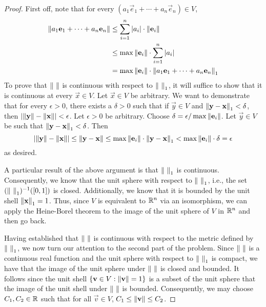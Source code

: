 \documentclass[../psets.tex]{subfiles}
\begin{document}
\begin{enumerate}
\begin{enumerate}
\begin{proof}
            First off, note that for every $(a_1\vec{e}_1+\cdots+a_n\vec{e}_n)\in V$,
            \begin{align*}
                \norm{a_1\mathbf{e}_1+\cdots+a_n\mathbf{e}_n} &\leq \sum_{i=1}^n|a_i|\cdot\norm{\mathbf{e}_i}\\
                &\leq \max\norm{\mathbf{e}_i}\cdot\sum_{i=1}^n|a_i|\\
                &= \max\norm{\mathbf{e}_i}\cdot\norm{a_1\mathbf{e}_1+\cdots+a_n\mathbf{e}_n}_1
            \end{align*}
            To prove that $\norm{\ }$ is continuous with respect to $\norm{\ }_1$, it will suffice to show that it is continuous at every $\vec{x}\in V$. Let $\vec{x}\in V$ be arbitrary. We want to demonstrate that for every $\epsilon>0$, there exists a $\delta>0$ such that if $\vec{y}\in V$ and $\norm{\mathbf{y}-\mathbf{x}}_1<\delta$, then $|\norm{\mathbf{y}}-\norm{\mathbf{x}}|<\epsilon$. Let $\epsilon>0$ be arbitrary. Choose $\delta=\epsilon/\max\norm{\mathbf{e}_i}$. Let $\vec{y}\in V$ be such that $\norm{\mathbf{y}-\mathbf{x}}_1<\delta$. Then
            \begin{equation*}
                |\norm{\mathbf{y}}-\norm{\mathbf{x}}| \leq \norm{\mathbf{y}-\mathbf{x}}
                \leq \max\norm{\mathbf{e}_i}\cdot\norm{\mathbf{y}-\mathbf{x}}_1
                < \max\norm{\mathbf{e}_i}\cdot\delta
                = \epsilon
            \end{equation*}
            as desired.\par
            A particular result of the above argument is that $\norm{\ }_1$ is continuous. Consequently, we know that the unit sphere with respect to $\norm{\ }_1$, i.e., the set $(\norm{\ }_1)^{-1}([0,1])$ is closed. Additionally, we know that it is bounded by the unit shell $\norm{\mathbf{x}}_1=1$. Thus, since $V$ is equivalent to $\mathbb{R}^n$ via an isomorphism, we can apply the Heine-Borel theorem to the image of the unit sphere of $V$ in $\mathbb{R}^n$ and then go back.\par
            Having established that $\norm{\ }$ is continuous with respect to the metric defined by $\norm{\ }_1$, we now turn our attention to the second part of the problem. Since $\norm{\ }$ is a continuous real function and the unit sphere with respect to $\norm{\ }_1$ is compact, we have that the image of the unit sphere under $\norm{\ }$ is closed and bounded. It follows since the unit shell $\{\mathbf{v}\in V:\norm{\mathbf{v}}=1\}$ is a subset of the unit sphere that the image of the unit shell under $\norm{\ }$ is bounded. Consequently, we may choose $C_1,C_2\in\mathbb{R}$ such that for all $\vec{v}\in V$, $C_1\leq\norm{\mathbf{v}}\leq C_2$.

\end{proof}
\end{enumerate}
\end{enumerate}
\end{document}
